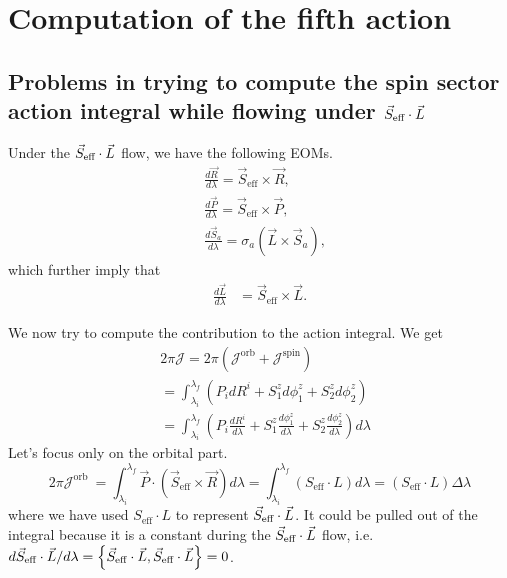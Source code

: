\chapter{Computation of the fifth action}    \label{chapter-6}



\section{Problems in trying to compute the spin sector action integral while flowing under $\vec{S}_{\text{eff}}\cdot \vec{L}$}


Under the $\vec{S}_{\text{eff}}\cdot \vec{L}$ flow, we have the following
EOMs.
\begin{equation}
\begin{aligned}
&\frac{d \vec{R}}{d \lambda}=\vec{S}_{\mathrm{eff}} \times \vec{R} , \\
&\frac{d \vec{P}}{d \lambda}=\vec{S}_{\mathrm{eff}} \times \vec{P} ,  \\
& \frac{d \vec{S}_{a}}{d \lambda} =\sigma_{a}\left(\vec{L} \times \vec{S}_{a}\right),
\end{aligned}
\end{equation}
which further imply that
\begin{equation}
\begin{aligned}
\frac{d \vec{L}}{d \lambda} &=\vec{S}_{\mathrm{eff}} \times \vec{L}.
\end{aligned}
\end{equation}


We now try to compute the contribution to the action integral.
We get
\begin{equation}    \label{J5_1}
\begin{aligned}
&2 \pi \mathcal{J} =2 \pi\left(\mathcal{J}^{\mathrm{orb}}+\mathcal{J}^{\mathrm{spin}}\right) \\
&=\int_{\lambda_{i}}^{\lambda_{f}}\left(P_{i}  {d R^{i}}
+  S_1^z {d \phi_1^z}
+  S_2^z {d \phi_2^z}
\right)     \\
&=\int_{\lambda_{i}}^{\lambda_{f}}\left(P_{i} \frac{d R^{i}}{d \lambda}
+  S_1^z \frac{d \phi_1^z}{d \lambda}
+  S_2^z \frac{d \phi_2^z}{d \lambda}
\right) d \lambda
\end{aligned}
\end{equation}
Let's focus only on the orbital part.
\begin{equation}    \label{J5_orb_B}
2 \pi \mathcal{J}^{\text {orb }}=\int_{\lambda_{i}}^{\lambda_{f}} \vec{P} \cdot\left(\vec{S}_{\mathrm{eff}} \times \vec{R}\right) d \lambda=\int_{\lambda_{i}}^{\lambda_{f}}\left(S_{\mathrm{eff}} \cdot L\right) d \lambda=\left(S_{\mathrm{eff}} \cdot L\right) \Delta \lambda
\end{equation}
where we have used $S_{\mathrm{eff}} \cdot L$ to represent
$\vec{S}_{\text{eff}}\cdot \vec{L}$. It could be pulled out of the integral because it is a constant 
during the $\vec{S}_{\text{eff}}\cdot \vec{L}$ flow, i.e. $d{\vec{S}_{\text{eff}}\cdot \vec{L}}/d \lambda =  \left\lbrace \vec{S}_{\text{eff}}\cdot \vec{L}, \vec{S}_{\text{eff}}\cdot \vec{L} \right\rbrace = 0$.



